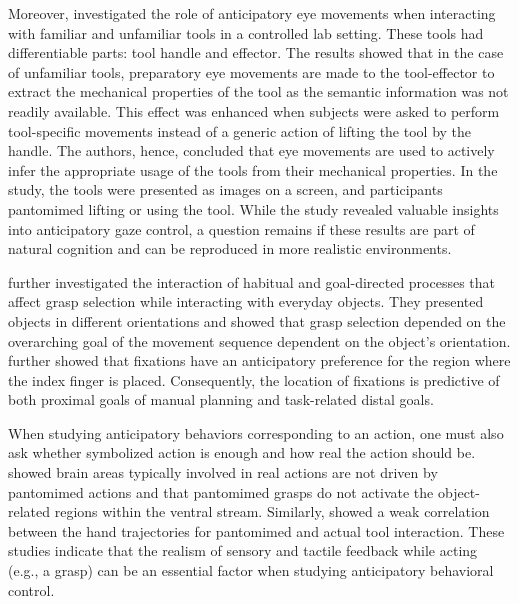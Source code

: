 Moreover, \citet{Belardinelli2016-xb} investigated the role of anticipatory eye movements when interacting with familiar and unfamiliar tools in a controlled lab setting. These tools had differentiable parts: tool handle and effector. The results showed that in the case of unfamiliar tools, preparatory eye movements are made to the tool-effector to extract the mechanical properties of the tool as the semantic information was not readily available. This effect was enhanced when subjects were asked to perform tool-specific movements instead of a generic action of lifting the tool by the handle. The authors, hence, concluded that eye movements are used to actively infer the appropriate usage of the tools from their mechanical properties. In the study, the tools were presented as images on a screen, and participants pantomimed lifting or using the tool. While the study revealed valuable insights into anticipatory gaze control, a question remains if these results are part of natural cognition and can be reproduced in more realistic environments.

\citet{Herbort2011-hf}  further investigated the interaction of habitual and goal-directed processes that affect grasp selection while interacting with everyday objects. They presented objects in different orientations and showed that grasp selection depended on the overarching goal of the movement sequence dependent on the object’s orientation. \citet{Belardinelli2016-kf} further showed that fixations have an anticipatory preference for the region where the index finger is placed. Consequently, the location of fixations is predictive of both proximal goals of manual planning and task-related distal goals.

When studying anticipatory behaviors corresponding to an action, one must also ask whether symbolized action is enough and how real the action should be. \citet{Kroliczak2007-wo} showed brain areas typically involved in real actions are not driven by pantomimed actions and that pantomimed grasps do not activate the object-related regions within the ventral stream. Similarly, \citet{Hermsdorfer2012-ca} showed a weak correlation between the hand trajectories for pantomimed and actual tool interaction. These studies indicate that the realism of sensory and tactile feedback while acting (e.g., a grasp) can be an essential factor when studying anticipatory behavioral control.

